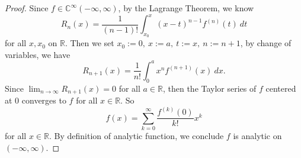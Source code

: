\begin{Exercise}
\begin{proof}
Since $f\in\mathbb{C}^{\infty}(-\infty, \infty)$, by the Lagrange Theorem, we know
$$ R_n(x) = \frac{1}{(n-1)!} \int_{x_0}^{x} (x-t)^{n-1} f^{(n)} (t) \ dt$$ for all $x, x_0$ on $\mathbb{R}$. Then we set $x_0 := 0,\ x:=a,\ t:=x,\ n:=n+1$, by change of variables, we have
$$ R_{n+1}(x) =  \frac{1}{n!} \int_{0}^{a} x^n f^{(n+1)} (x) \ dx.$$
Since $\lim_{n\to\infty} R_{n+1}(x) = 0$ for all $a\in\mathbb{R}$, then the Taylor series of $f$ centered at $0$ converges to $f$ for all $x\in\mathbb{R}$. So $$f(x) = \sum_{k=0}^{\infty} \frac{f^{(k)}(0)}{k!} x^k$$
for all $x\in\mathbb{R}$. By definition of analytic function, we conclude $f$ is analytic on $(-\infty, \infty)$.
\end{proof}
\end{Exercise}